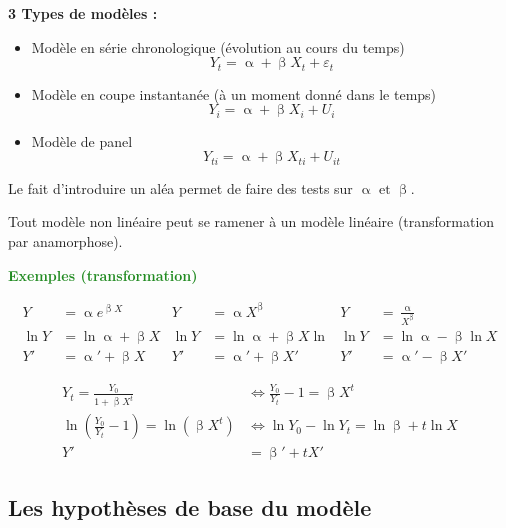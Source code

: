 \documentclass{article}
\begin{document}
\textbf{3 Types de modèles :}
\begin{itemize}
    \item Modèle en série chronologique (évolution au cours du temps)
    \[ Y_t = \upalpha + \upbeta X_t + \varepsilon_t \]
    \item Modèle en coupe instantanée (à un moment donné dans le temps)
    \[ Y_i = \upalpha + \upbeta X_i + U_i \]
    \item Modèle de panel
    \[ Y_{ti} = \upalpha + \upbeta X_{ti} + U_{it}\]
\end{itemize}
Le fait d'introduire un aléa permet de faire des tests sur \(\upalpha \textrm{ et } \upbeta\). \newline

Tout modèle non linéaire peut se ramener à un modèle linéaire (transformation par anamorphose).
\begin{center}
    \textbf{\textcolor{ForestGreen}{Exemples (transformation)}}
\end{center}
\begin{align*}
	Y &= \upalpha e^{\upbeta X} & Y&= \upalpha X^{\upbeta} & Y&= \frac{\upalpha}{X^\upbeta} \\
	 \ln Y &= \ln \upalpha + \upbeta X & \ln Y&= \ln \upalpha + \upbeta X  \ln & \ln Y&= \ln \upalpha - \upbeta \ln X \\
	 Y' &= \upalpha' + \upbeta X & Y' &= \upalpha' + \upbeta X' & Y' &= \upalpha' - \upbeta X'
\end{align*}

\begin{align*}
    Y_t = \frac{Y_0}{1 + \upbeta X^t} &\Leftrightarrow \frac{Y_0}{Y_t} - 1 = \upbeta X^t \\
    \ln (\frac{Y_0}{Y_t} - 1) = \ln (\upbeta X^t) &\Leftrightarrow \ln Y_0 - \ln Y_t = \ln \upbeta + t \ln X \\
    Y' &= \upbeta' + t X'
\end{align*}





\subsection{Les hypothèses de base du modèle}
\end{document}
